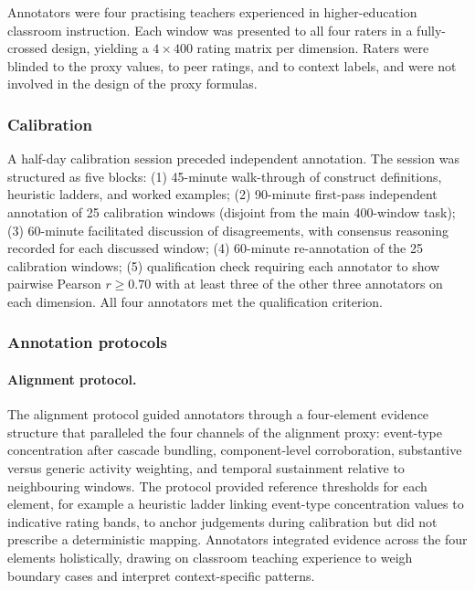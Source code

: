 \documentclass[preprint,12pt,authoryear]{elsarticle}
\begin{document}
Annotators were four practising teachers experienced in higher-education classroom instruction. Each window was presented to all four raters in a fully-crossed design, yielding a $4 \times 400$ rating matrix per dimension. Raters were blinded to the proxy values, to peer ratings, and to context labels, and were not involved in the design of the proxy formulas.

\subsubsection{Calibration}

A half-day calibration session preceded independent annotation. The session was structured as five blocks: (1) 45-minute walk-through of construct definitions, heuristic ladders, and worked examples; (2) 90-minute first-pass independent annotation of 25 calibration windows (disjoint from the main 400-window task); (3) 60-minute facilitated discussion of disagreements, with consensus reasoning recorded for each discussed window; (4) 60-minute re-annotation of the 25 calibration windows; (5) qualification check requiring each annotator to show pairwise Pearson $r \geq 0.70$ with at least three of the other three annotators on each dimension. All four annotators met the qualification criterion.

\subsubsection{Annotation protocols}

\paragraph{Alignment protocol.}
The alignment protocol guided annotators through a four-element evidence structure that paralleled the four channels of the alignment proxy: event-type concentration after cascade bundling, component-level corroboration, substantive versus generic activity weighting, and temporal sustainment relative to neighbouring windows. The protocol provided reference thresholds for each element, for example a heuristic ladder linking event-type concentration values to indicative rating bands, to anchor judgements during calibration but did not prescribe a deterministic mapping. Annotators integrated evidence across the four elements holistically, drawing on classroom teaching experience to weigh boundary cases and interpret context-specific patterns.
\end{document}
